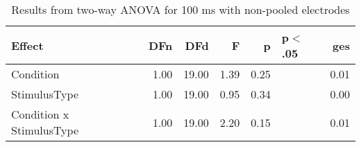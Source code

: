 \begin{table}[ht]
\centering
\begin{tabulary}{\textwidth}{lrrrrlr}
  \toprule
Effect & DFn & DFd & F & p & p$<$.05 & ges \\ 
  \midrule
Condition & 1.00 & 19.00 & 1.39 & 0.25 &  & 0.01 \\ 
  StimulusType & 1.00 & 19.00 & 0.95 & 0.34 &  & 0.00 \\ 
  Condition x StimulusType & 1.00 & 19.00 & 2.20 & 0.15 &  & 0.01 \\ 
   \bottomrule
\end{tabulary}
\caption{Results from two-way ANOVA for 100 ms with non-pooled electrodes} 
\end{table}
